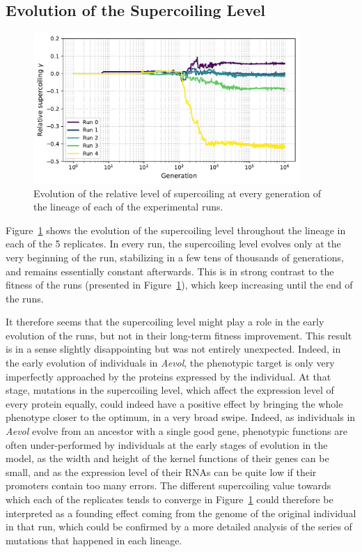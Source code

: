 \subsection{Evolution of the Supercoiling Level}

\begin{figure}
  \centering
  \includegraphics[width=0.9\textwidth]{aevol/images/supercoiling_all.pdf}
  \caption[Evolution of the supercoiling level of the experimental runs in \emph{Aevol}]{Evolution of the relative level of supercoiling at every generation of the lineage of each of the experimental runs.}
  \label{fig:aevol:sc}
\end{figure}

Figure~\ref{fig:aevol:sc} shows the evolution of the supercoiling level throughout the lineage in each of the 5 replicates.
In every run, the supercoiling level evolves only at the very beginning of the run, stabilizing in a few tens of thousands of generations, and remains essentially constant afterwards.
This is in strong contrast to the fitness of the runs (presented in Figure~\ref{fig:aevol:sc}), which keep increasing until the end of the runs.

It therefore seems that the supercoiling level might play a role in the early evolution of the runs, but not in their long-term fitness improvement.
This result is in a sense slightly disappointing but was not entirely unexpected.
Indeed, in the early evolution of individuals in \emph{Aevol}, the phenotypic target is only very imperfectly approached by the proteins expressed by the individual.
At that stage, mutations in the supercoiling level, which affect the expression level of every protein equally, could indeed have a positive effect by bringing the whole phenotype closer to the optimum, in a very broad swipe.
Indeed, as individuals in \emph{Aevol} evolve from an ancestor with a single good gene, phenotypic functions are often under-performed by individuals at the early stages of evolution in the model, as the width and height of the kernel functions of their genes can be small, and as the expression level of their RNAs can be quite low if their promoters contain too many errors.
The different supercoiling value towards which each of the replicates tends to converge in Figure~\ref{fig:aevol:sc} could therefore be interpreted as a founding effect coming from the genome of the original individual in that run, which could be confirmed by a more detailed analysis of the series of mutations that happened in each lineage.

